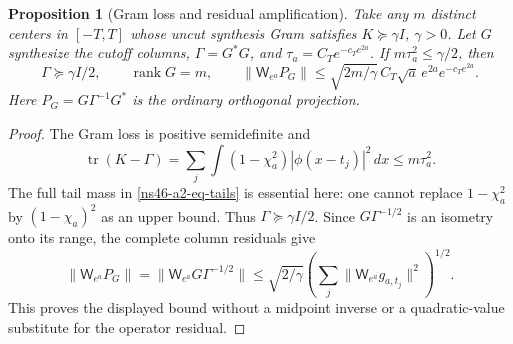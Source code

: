 \documentclass[11pt]{article}
\newtheorem{proposition}[theorem]{Proposition}
\theoremstyle{remark}
\begin{document}
\begin{proposition}[Gram loss and residual amplification]
\label{ns46-a2-prop-transfer}
Take any $m$ distinct centers in $[-T,T]$ whose uncut synthesis
Gram satisfies $K\succeq\gamma I$, $\gamma>0$.
Let $G$ synthesize the cutoff columns, $\Gamma=G^*G$, and
$\tau_a=C_Te^{-c_Te^{2a}}$. If
$m\tau_a^2\le\gamma/2$, then
\begin{equation}\label{ns46-a2-eq-transfer}
 \Gamma\succeq\gamma I/2,\qquad
 \operatorname{rank}G=m,\qquad
 \|\mathsf W_{e^a}P_G\|
 \le \sqrt{2m/\gamma}\,
         C_T\sqrt a\,e^{2a}e^{-c_Te^{2a}}.
\end{equation}
Here $P_G=G\Gamma^{-1}G^*$ is the ordinary orthogonal projection.
\end{proposition}
\begin{proof}
The Gram loss is positive semidefinite and
\[
 \operatorname{tr}(K-\Gamma)
 =\sum_j\int(1-\chi_a^2)|\phi(x-t_j)|^2\,dx
 \le m\tau_a^2.
\]
The full tail mass in \eqref{ns46-a2-eq-tails} is essential here:
one cannot replace $1-\chi_a^2$ by $(1-\chi_a)^2$ as an upper bound.
Thus $\Gamma\succeq\gamma I/2$. Since $G\Gamma^{-1/2}$ is an
isometry onto its range, the complete column residuals give
\[
 \|\mathsf W_{e^a}P_G\|
 =\|\mathsf W_{e^a}G\Gamma^{-1/2}\|
 \le\sqrt{2/\gamma}
       \left(\sum_j\|\mathsf W_{e^a}g_{a,t_j}\|^2\right)^{1/2}.
\]
This proves the displayed bound without a midpoint inverse or a
quadratic-value substitute for the operator residual.
\end{proof}
\end{document}

